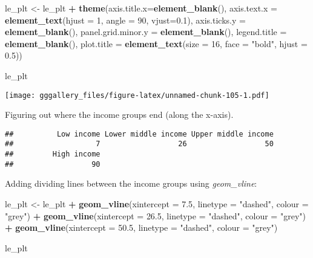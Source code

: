 \documentclass[]{book}
\newenvironment{Shaded}{\begin{snugshade}}{\end{snugshade}}
\newcommand{\DataTypeTok}[1]{\textcolor[rgb]{0.13,0.29,0.53}{#1}}
\newcommand{\DecValTok}[1]{\textcolor[rgb]{0.00,0.00,0.81}{#1}}
\newcommand{\FloatTok}[1]{\textcolor[rgb]{0.00,0.00,0.81}{#1}}
\newcommand{\KeywordTok}[1]{\textcolor[rgb]{0.13,0.29,0.53}{\textbf{#1}}}
\newcommand{\NormalTok}[1]{#1}
\newcommand{\OperatorTok}[1]{\textcolor[rgb]{0.81,0.36,0.00}{\textbf{#1}}}
\newcommand{\StringTok}[1]{\textcolor[rgb]{0.31,0.60,0.02}{#1}}
\begin{document}
\begin{Shaded}
\begin{Highlighting}[]
\NormalTok{le_plt <-}\StringTok{ }\NormalTok{le_plt }\OperatorTok{+}\StringTok{ }
\StringTok{    }\KeywordTok{theme}\NormalTok{(}\DataTypeTok{axis.title.x=}\KeywordTok{element_blank}\NormalTok{(),}
        \DataTypeTok{axis.text.x =} \KeywordTok{element_text}\NormalTok{(}\DataTypeTok{hjust =} \DecValTok{1}\NormalTok{, }\DataTypeTok{angle =} \DecValTok{90}\NormalTok{, }\DataTypeTok{vjust=}\FloatTok{0.1}\NormalTok{),}
        \DataTypeTok{axis.ticks.y =} \KeywordTok{element_blank}\NormalTok{(),}
        \DataTypeTok{panel.grid.minor.y =} \KeywordTok{element_blank}\NormalTok{(),}
        \DataTypeTok{legend.title =} \KeywordTok{element_blank}\NormalTok{(),}
        \DataTypeTok{plot.title =} \KeywordTok{element_text}\NormalTok{(}\DataTypeTok{size =} \DecValTok{16}\NormalTok{, }\DataTypeTok{face =} \StringTok{"bold"}\NormalTok{, }\DataTypeTok{hjust =} \FloatTok{0.5}\NormalTok{))}

\NormalTok{le_plt}
\end{Highlighting}
\end{Shaded}

\texttt{[image: gggallery\_files/figure-latex/unnamed-chunk-105-1.pdf]}

Figuring out where the income groups end (along the x-axis).

\begin{Shaded}
\end{Shaded}

\begin{verbatim}
##          Low income Lower middle income Upper middle income 
##                   7                  26                  50 
##         High income 
##                  90
\end{verbatim}

Adding dividing lines between the income groups using \emph{geom\_vline}:

\begin{Shaded}
\begin{Highlighting}[]
\NormalTok{le_plt <-}\StringTok{ }\NormalTok{le_plt }\OperatorTok{+}
\StringTok{  }\KeywordTok{geom_vline}\NormalTok{(}\DataTypeTok{xintercept =} \FloatTok{7.5}\NormalTok{, }\DataTypeTok{linetype =} \StringTok{"dashed"}\NormalTok{, }\DataTypeTok{colour =} \StringTok{"grey"}\NormalTok{) }\OperatorTok{+}
\StringTok{  }\KeywordTok{geom_vline}\NormalTok{(}\DataTypeTok{xintercept =} \FloatTok{26.5}\NormalTok{, }\DataTypeTok{linetype =} \StringTok{"dashed"}\NormalTok{, }\DataTypeTok{colour =} \StringTok{"grey"}\NormalTok{) }\OperatorTok{+}
\StringTok{  }\KeywordTok{geom_vline}\NormalTok{(}\DataTypeTok{xintercept =} \FloatTok{50.5}\NormalTok{, }\DataTypeTok{linetype =} \StringTok{"dashed"}\NormalTok{, }\DataTypeTok{colour =} \StringTok{"grey"}\NormalTok{)}

\NormalTok{le_plt }
\end{Highlighting}
\end{Shaded}
\end{document}
